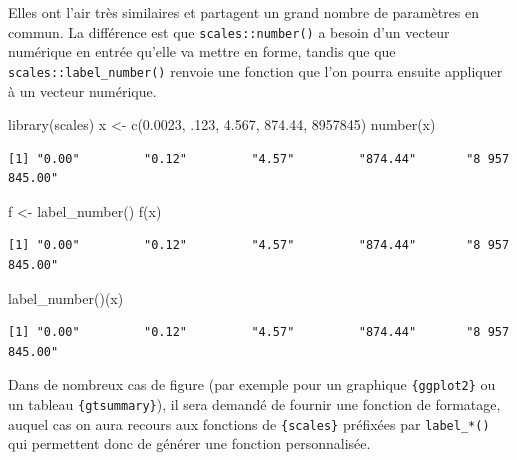 \documentclass[
  letterpaper,
  DIV=11,
  numbers=noendperiod,
  oneside]{scrreprt}
\newenvironment{Shaded}{\begin{snugshade}}{\end{snugshade}}
\newcommand{\DecValTok}[1]{\textcolor[rgb]{0.68,0.00,0.00}{#1}}
\newcommand{\FloatTok}[1]{\textcolor[rgb]{0.68,0.00,0.00}{#1}}
\newcommand{\FunctionTok}[1]{\textcolor[rgb]{0.28,0.35,0.67}{#1}}
\newcommand{\NormalTok}[1]{\textcolor[rgb]{0.00,0.23,0.31}{#1}}
\newcommand{\OtherTok}[1]{\textcolor[rgb]{0.00,0.23,0.31}{#1}}
\begin{document}
Elles ont l'air très similaires et partagent un grand nombre de
paramètres en commun. La différence est que \texttt{scales::number()} a
besoin d'un vecteur numérique en entrée qu'elle va mettre en forme,
tandis que que \texttt{scales::label\_number()} renvoie une fonction que
l'on pourra ensuite appliquer à un vecteur numérique.

\begin{Shaded}
\begin{Highlighting}[]
\FunctionTok{library}\NormalTok{(scales)}
\NormalTok{x }\OtherTok{\textless{}{-}} \FunctionTok{c}\NormalTok{(}\FloatTok{0.0023}\NormalTok{, .}\DecValTok{123}\NormalTok{, }\FloatTok{4.567}\NormalTok{, }\FloatTok{874.44}\NormalTok{, }\DecValTok{8957845}\NormalTok{)}
\FunctionTok{number}\NormalTok{(x)}
\end{Highlighting}
\end{Shaded}

\begin{verbatim}
[1] "0.00"         "0.12"         "4.57"         "874.44"       "8 957 845.00"
\end{verbatim}

\begin{Shaded}
\begin{Highlighting}[]
\NormalTok{f }\OtherTok{\textless{}{-}} \FunctionTok{label\_number}\NormalTok{()}
\FunctionTok{f}\NormalTok{(x)}
\end{Highlighting}
\end{Shaded}

\begin{verbatim}
[1] "0.00"         "0.12"         "4.57"         "874.44"       "8 957 845.00"
\end{verbatim}

\begin{Shaded}
\begin{Highlighting}[]
\FunctionTok{label\_number}\NormalTok{()(x)}
\end{Highlighting}
\end{Shaded}

\begin{verbatim}
[1] "0.00"         "0.12"         "4.57"         "874.44"       "8 957 845.00"
\end{verbatim}

Dans de nombreux cas de figure (par exemple pour un graphique
\texttt{\{ggplot2\}} ou un tableau \texttt{\{gtsummary\}}), il sera
demandé de fournir une fonction de formatage, auquel cas on aura recours
aux fonctions de \texttt{\{scales\}} préfixées par \texttt{label\_*()}
qui permettent donc de générer une fonction personnalisée.
\end{document}
